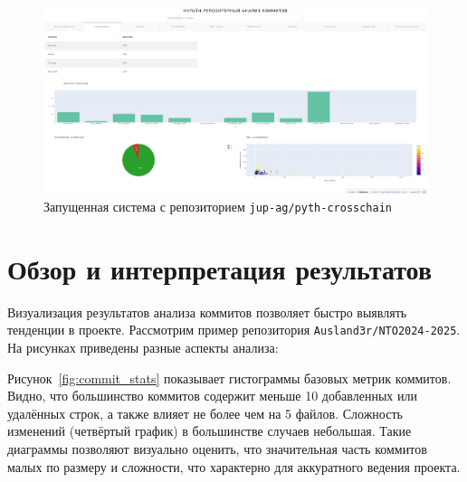 \begin{figure}[ht]
	\centering
	\includegraphics[width=\textwidth]{my_folder/images/nagruzka.png}
	\caption{Запущенная система с репозиторием \texttt{jup-ag/pyth-crosschain}}
	\label{tab:nagruzka}
\end{figure}

\section{Обзор и интерпретация результатов}
Визуализация результатов анализа коммитов позволяет быстро выявлять тенденции в проекте. Рассмотрим пример репозитория \texttt{Ausland3r/NTO2024-2025}. На рисунках приведены разные аспекты анализа:

Рисунок~\ref{fig:commit_stats} показывает гистограммы базовых метрик коммитов. Видно, что большинство коммитов содержит меньше 10 добавленных или удалённых строк, а также влияет не более чем на 5 файлов. Сложность изменений (четвёртый график) в большинстве случаев небольшая. Такие диаграммы позволяют визуально оценить, что значительная часть коммитов малых по размеру и сложности, что характерно для аккуратного ведения проекта. 

